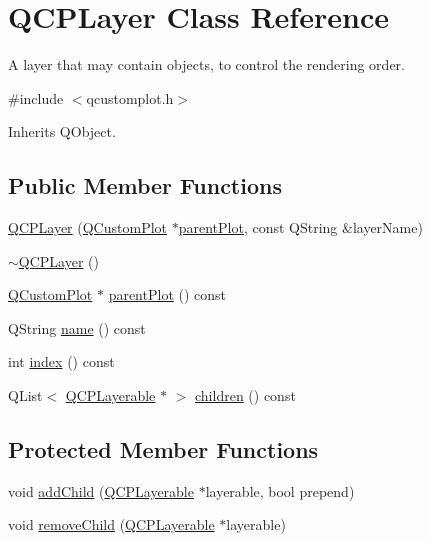 \hypertarget{class_q_c_p_layer}{\section{Q\-C\-P\-Layer Class Reference}
\label{class_q_c_p_layer}
}


A layer that may contain objects, to control the rendering order.  




{\ttfamily \#include $<$qcustomplot.\-h$>$}



Inherits Q\-Object.

\subsection*{Public Member Functions}
\begin{DoxyCompactItemize}
\item 
\hyperlink{class_q_c_p_layer_a5d0657fc86d624e5efbe930ef21af718}{Q\-C\-P\-Layer} (\hyperlink{class_q_custom_plot}{Q\-Custom\-Plot} $\ast$\hyperlink{class_q_c_p_layer_a3958c9a938c2d05a7378c41484acee08}{parent\-Plot}, const Q\-String \&layer\-Name)
\item 
\hyperlink{class_q_c_p_layer_afc1a8940f8e34c9f25ead9dfd4828cae}{$\sim$\-Q\-C\-P\-Layer} ()
\item 
\hyperlink{class_q_custom_plot}{Q\-Custom\-Plot} $\ast$ \hyperlink{class_q_c_p_layer_a3958c9a938c2d05a7378c41484acee08}{parent\-Plot} () const 
\item 
Q\-String \hyperlink{class_q_c_p_layer_a96ebd1e436f3813938cb9cd4a59a60be}{name} () const 
\item 
int \hyperlink{class_q_c_p_layer_ad5d7010829a6b99f326b07d7e37c8c99}{index} () const 
\item 
Q\-List$<$ \hyperlink{class_q_c_p_layerable}{Q\-C\-P\-Layerable} $\ast$ $>$ \hyperlink{class_q_c_p_layer_a94c2f0100e48cefad2de8fe0fbb03c27}{children} () const 
\end{DoxyCompactItemize}
\subsection*{Protected Member Functions}
\begin{DoxyCompactItemize}
\item 
void \hyperlink{class_q_c_p_layer_a57ce5e49364aa9122276d5df3b4a0ddc}{add\-Child} (\hyperlink{class_q_c_p_layerable}{Q\-C\-P\-Layerable} $\ast$layerable, bool prepend)
\item 
void \hyperlink{class_q_c_p_layer_ac2f64ac7761650582d968d86670ef362}{remove\-Child} (\hyperlink{class_q_c_p_layerable}{Q\-C\-P\-Layerable} $\ast$layerable)
\end{DoxyCompactItemize}
